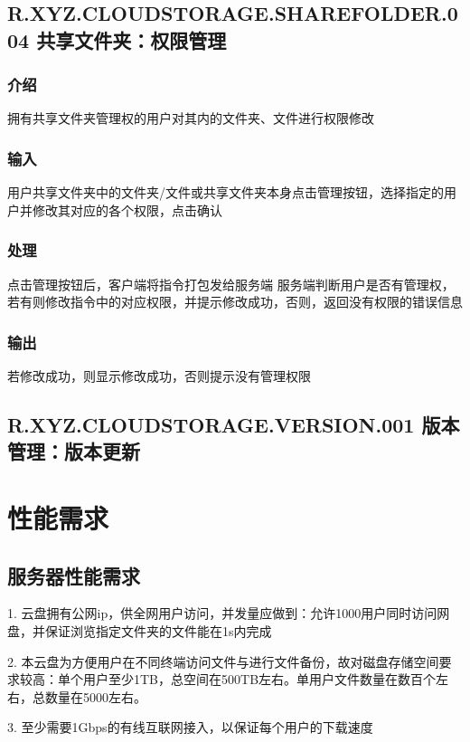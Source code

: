 \subsection{R.XYZ.CLOUDSTORAGE.SHAREFOLDER.004 共享文件夹：权限管理}

\subsubsection{介绍}
拥有共享文件夹管理权的用户对其内的文件夹、文件进行权限修改

\subsubsection{输入} 
用户共享文件夹中的文件夹/文件或共享文件夹本身点击管理按钮，选择指定的用户并修改其对应的各个权限，点击确认

\subsubsection{处理} 
点击管理按钮后，客户端将指令打包发给服务端
服务端判断用户是否有管理权，若有则修改指令中的对应权限，并提示修改成功，否则，返回没有权限的错误信息

\subsubsection{输出} 
若修改成功，则显示修改成功，否则提示没有管理权限

\subsection{R.XYZ.CLOUDSTORAGE.VERSION.001 版本管理：版本更新}

\section{性能需求}

\subsection{服务器性能需求}
 
1. 云盘拥有公网ip，供全网用户访问，并发量应做到：允许1000用户同时访问网盘，并保证浏览指定文件夹的文件能在1s内完成

2. 本云盘为方便用户在不同终端访问文件与进行文件备份，故对磁盘存储空间要求较高：单个用户至少1TB，总空间在500TB左右。单用户文件数量在数百个左右，总数量在5000左右。

3. 至少需要1Gbps的有线互联网接入，以保证每个用户的下载速度

